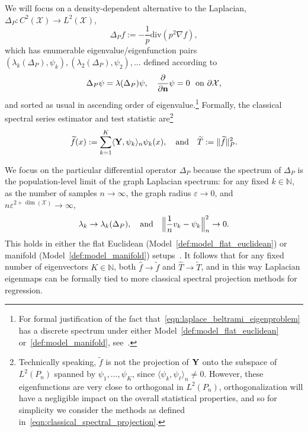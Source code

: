 \documentclass[aos]{imsart}
\theoremstyle{plain}
\theoremstyle{definition}
\theoremstyle{remark}
\newcommand{\dotp}[2]{\langle #1, #2 \rangle}
\newcommand{\wt}[1]{\widetilde{#1}}
\newcommand{\wh}[1]{\widehat{#1}}
\newcommand{\mc}[1]{\mathcal{#1}}
\newcommand{\1}{\mathbf{1}}
\begin{document}
We will focus on a density-dependent alternative to the Laplacian,  $\Delta_P:C^2(\mc{X}) \to L^2(\mc{X})$,
\begin{equation}
\label{eqn:laplace_beltrami}
\Delta_Pf := -\frac{1}{p} \mathrm{div}(p^2\nabla f),
\end{equation}
which has enumerable eigenvalue/eigenfunction pairs $(\lambda_k(\Delta_P),\psi_k),(\lambda_2(\Delta_P),\psi_2),\ldots$ defined according to
\begin{equation}
\label{eqn:laplace_beltrami_eigenproblem}
\Delta_P\psi = \lambda(\Delta_P) \psi, \quad \frac{\partial}{\partial{\bf n}}\psi = 0~~\textrm{on $\partial \mc{X}$,}
\end{equation}
and sorted as usual in ascending order of eigenvalue.\footnote{For formal justification of the fact that~\eqref{eqn:laplace_beltrami_eigenproblem} has a discrete spectrum under either Model~\ref{def:model_flat_euclidean} or~\ref{def:model_manifold}, see~\cite{garciatrillos18,trillos2019}.} Formally, the classical spectral series estimator and test statistic are\footnote{Technically speaking, $\wt{f}$ is not the projection of ${\bf Y}$ onto the subspace of $L^2(P_n)$ spanned by $\psi_1,\ldots,\psi_K$, since $\dotp{\psi_k}{\psi_{\ell}}_n \neq 0$. However, these eigenfunctions are very close to orthogonal in $L^2(P_n)$, orthogonalization will have a negligible impact on the overall statistical properties, and so for simplicity we consider the methods as defined in~\eqref{eqn:classical_spectral_projection}.}
\begin{equation}
\label{eqn:classical_spectral_projection}
\wt{f}(x) := \sum_{k = 1}^{K} \dotp{{\bf Y}}{\psi_k}_{n} \psi_k(x),\quad\textrm{and}\quad \wt{T} := \|\wt{f}\|_P^2.
\end{equation}

We focus on the particular differential operator $\Delta_P$ because the spectrum of $\Delta_P$ is the population-level limit of the graph Laplacian spectrum: for any fixed $k \in \mathbb{N}$, as the number of samples $n \to \infty$, the graph radius $\varepsilon \to 0$, and $n\varepsilon^{2 + \dim(\mc{X})} \to \infty$,
\begin{equation}
\lambda_k \to \lambda_k(\Delta_P), \quad\textrm{and}\quad \Bigl\|\frac{1}{n}v_k - \psi_k\Bigr\|_n^2 \to 0.
\end{equation}
This holds in either the flat Euclidean (Model~\ref{def:model_flat_euclidean}) or manifold (Model~\ref{def:model_manifold}) setups~\citep{garciatrillos18,trillos2019}. It follows that for any fixed number of eigenvectors $K \in \mathbb{N}$, both $\wh{f} \to \wt{f}$ and $\wh{T} \to \wt{T}$, and in this way Laplacian eigenmaps can be formally tied to more classical spectral projection methods for regression.
\end{document}
